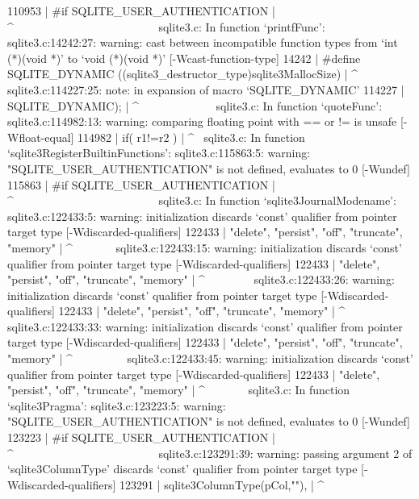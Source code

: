 {{{{{{{{{{{{{{{{110953 | #if SQLITE_USER_AUTHENTICATION
       |     ^~~~~~~~~~~~~~~~~~~~~~~~~~
sqlite3.c: In function ‘printfFunc’:
sqlite3.c:14242:27: warning: cast between incompatible function types from ‘int (*)(void *)’ to ‘void (*)(void *)’ [-Wcast-function-type]
14242 | #define SQLITE_DYNAMIC   ((sqlite3_destructor_type)sqlite3MallocSize)
      |                           ^
sqlite3.c:114227:25: note: in expansion of macro ‘SQLITE_DYNAMIC’
114227 |                         SQLITE_DYNAMIC);
       |                         ^~~~~~~~~~~~~~
sqlite3.c: In function ‘quoteFunc’:
sqlite3.c:114982:13: warning: comparing floating point with == or != is unsafe [-Wfloat-equal]
114982 |       if( r1!=r2 ){
       |             ^~
sqlite3.c: In function ‘sqlite3RegisterBuiltinFunctions’:
sqlite3.c:115863:5: warning: "SQLITE_USER_AUTHENTICATION" is not defined, evaluates to 0 [-Wundef]
115863 | #if SQLITE_USER_AUTHENTICATION
       |     ^~~~~~~~~~~~~~~~~~~~~~~~~~
sqlite3.c: In function ‘sqlite3JournalModename’:
sqlite3.c:122433:5: warning: initialization discards ‘const’ qualifier from pointer target type [-Wdiscarded-qualifiers]
122433 |     "delete", "persist", "off", "truncate", "memory"
       |     ^~~~~~~~
sqlite3.c:122433:15: warning: initialization discards ‘const’ qualifier from pointer target type [-Wdiscarded-qualifiers]
122433 |     "delete", "persist", "off", "truncate", "memory"
       |               ^~~~~~~~~
sqlite3.c:122433:26: warning: initialization discards ‘const’ qualifier from pointer target type [-Wdiscarded-qualifiers]
122433 |     "delete", "persist", "off", "truncate", "memory"
       |                          ^~~~~
sqlite3.c:122433:33: warning: initialization discards ‘const’ qualifier from pointer target type [-Wdiscarded-qualifiers]
122433 |     "delete", "persist", "off", "truncate", "memory"
       |                                 ^~~~~~~~~~
sqlite3.c:122433:45: warning: initialization discards ‘const’ qualifier from pointer target type [-Wdiscarded-qualifiers]
122433 |     "delete", "persist", "off", "truncate", "memory"
       |                                             ^~~~~~~~
sqlite3.c: In function ‘sqlite3Pragma’:
sqlite3.c:123223:5: warning: "SQLITE_USER_AUTHENTICATION" is not defined, evaluates to 0 [-Wundef]
123223 | #if SQLITE_USER_AUTHENTICATION
       |     ^~~~~~~~~~~~~~~~~~~~~~~~~~
sqlite3.c:123291:39: warning: passing argument 2 of ‘sqlite3ColumnType’ discards ‘const’ qualifier from pointer target type [-Wdiscarded-qualifiers]
123291 |                sqlite3ColumnType(pCol,""),
       |                                       ^~
}}}}}}}}}}}}}}}}}
